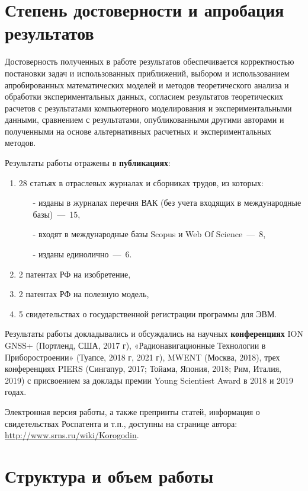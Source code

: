 \section*{Степень достоверности и апробация результатов}

Достоверность полученных в работе результатов обеспечивается корректностью постановки задач и использованных приближений, выбором и использованием апробированных математических моделей и методов теоретического анализа и обработки экспериментальных данных, согласием результатов теоретических расчетов с результатами компьютерного моделирования и экспериментальными данными, сравнением с результатами, опубликованными другими авторами и полученными на основе альтернативных расчетных и экспериментальных методов.

Результаты работы отражены в \textbf{публикациях}:
\begin{enumerate}
\item 28 статьях в отраслевых журналах и сборниках трудов, из которых:
    \begin{itemize}
		\item[-] изданы в журналах перечня ВАК (без учета входящих в международные базы)~---~15,
		\item[-] входят в международные базы Scopus и Web Of Science~---~8,
		\item[-] изданы единолично~---~6.
	\end{itemize}
\item 2 патентах РФ на изобретение,
\item 2 патентах РФ на полезную модель,
\item 5 свидетельствах о государственной регистрации программы для ЭВМ.
\end{enumerate}

Результаты работы докладывались и обсуждались на научных \textbf{конференциях} ION GNSS+ (Портленд, США, 2017 г), «Радионавигационные Технологии в Приборостроении» (Туапсе, 2018 г, 2021 г), MWENT (Москва, 2018), трех конференциях PIERS (Сингапур, 2017; Тойама, Япония, 2018; Рим, Италия, 2019) с присвоением за доклады премии Young Scientiest Award в 2018 и 2019 годах.    

Электронная версия работы, а также препринты статей, информация о свидетельствах Роспатента и т.п., доступны на странице автора: \url{http://www.srns.ru/wiki/Korogodin}.

\section*{Структура и объем работы}

